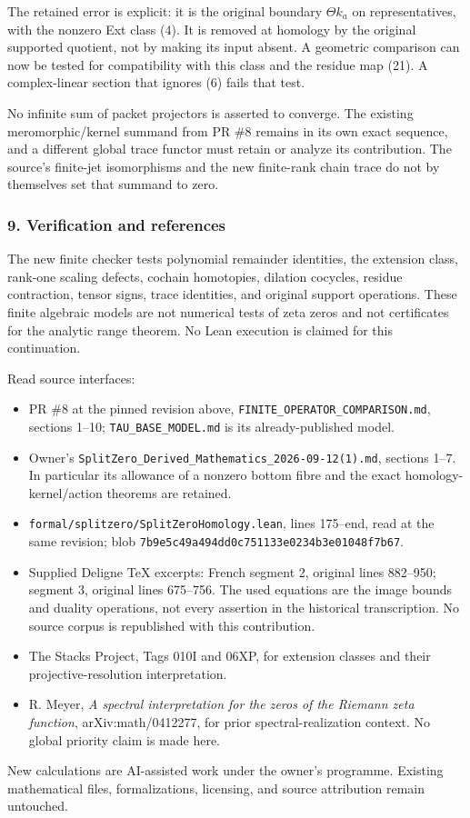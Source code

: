 The retained error is explicit: it is the original boundary \(\Theta k_a\) on representatives, with
the nonzero Ext class (4). It is removed at homology by the original supported quotient, not by
making its input absent. A geometric comparison can now be tested for compatibility with this class
and the residue map (21). A complex-linear section that ignores (6) fails that test.

No infinite sum of packet projectors is asserted to converge. The existing meromorphic/kernel
summand from PR \#8 remains in its own exact sequence, and a different global trace functor must
retain or analyze its contribution. The source's finite-jet isomorphisms and the new finite-rank
chain trace do not by themselves set that summand to zero.

\subsubsection{9. Verification and references}\label{pr_9:verification-and-references}

The new finite checker tests polynomial remainder identities, the extension class, rank-one scaling
defects, cochain homotopies, dilation cocycles, residue contraction, tensor signs, trace identities,
and original support operations. These finite algebraic models are not numerical tests of zeta zeros
and not certificates for the analytic range theorem. No Lean execution is claimed for this
continuation.

Read source interfaces:

\begin{itemize}
\tightlist
\item
  PR \#8 at the pinned revision above, \nolinkurl{FINITE_OPERATOR_COMPARISON.md}, sections 1--10;
  \nolinkurl{TAU_BASE_MODEL.md} is its already-published model.
\item
  Owner's \nolinkurl{SplitZero_Derived_Mathematics_2026-09-12(1).md}, sections 1--7. In particular
  its allowance of a nonzero bottom fibre and the exact homology-kernel/action theorems are
  retained.
\item
  \nolinkurl{formal/splitzero/SplitZeroHomology.lean}, lines 175--end, read at the same revision; blob
  \nolinkurl{7b9e5c49a494dd0c751133e0234b3e01048f7b67}.
\item
  Supplied Deligne TeX excerpts: French segment 2, original lines 882--950; segment 3, original
  lines 675--756. The used equations are the image bounds and duality operations, not every
  assertion in the historical transcription. No source corpus is republished with this contribution.
\item
  The Stacks Project, Tags 010I and 06XP, for extension classes and their projective-resolution
  interpretation.
\item
  R. Meyer, \emph{A spectral interpretation for the zeros of the Riemann zeta function},
  arXiv:math/0412277, for prior spectral-realization context. No global priority claim is made here.
\end{itemize}

New calculations are AI-assisted work under the owner's programme. Existing mathematical files,
formalizations, licensing, and source attribution remain untouched.
